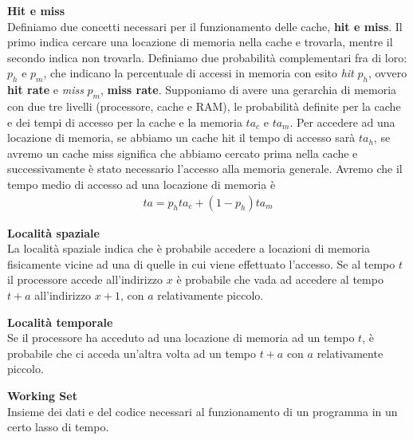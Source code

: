\begin{defn}
    \textbf{Hit e miss} \\
    Definiamo due concetti necessari per il funzionamento delle cache,
    \textbf{hit e miss}. Il primo indica cercare una locazione di memoria nella
    cache e trovarla, mentre il secondo indica non trovarla. Definiamo due
    probabilità complementari fra di loro: $p_h$ e $p_m$, che indicano la
    percentuale di accessi in memoria con esito \textit{hit} $p_h$, ovvero
    \textbf{hit rate} e \textit{miss} $p_m$, \textbf{miss rate}. Supponiamo di
    avere una gerarchia di memoria con due tre livelli (processore, cache e
    RAM), le probabilità definite per la cache e dei tempi di accesso per la
    cache e la memoria $ta_c$ e $ta_m$. Per accedere ad una locazione di
    memoria, se abbiamo un cache hit il tempo di accesso sarà $ta_h$, se avremo
    un cache miss significa che abbiamo cercato prima nella cache e
    successivamente è stato necessario l'accesso alla memoria generale. Avremo
    che il tempo medio di accesso ad una locazione di memoria è
    \begin{equation*}
        \begin{aligned}
            ta = p_h ta_c + (1-p_h)ta_m
        \end{aligned}
    \end{equation*}
\end{defn}

\begin{defn}
    \textbf{Località spaziale} \\
    La località spaziale indica che è probabile accedere a locazioni di memoria
    fisicamente vicine ad una di quelle in cui viene effettuato l'accesso. Se al
    tempo $t$ il processore accede all'indirizzo $x$ è probabile che vada ad
    accedere al tempo $t+a$ all'indirizzo $x+1$, con $a$ relativamente piccolo.
\end{defn}

\begin{defn}
    \textbf{Località temporale} \\
    Se il processore ha acceduto ad una locazione di memoria ad un tempo $t$, è
    probabile che ci acceda un'altra volta ad un tempo $t+a$ con $a$
    relativamente piccolo.
\end{defn}

\begin{defn}
    \textbf{Working Set} \\
    Insieme dei dati e del codice necessari al funzionamento di un programma in
    un certo lasso di tempo.
\end{defn}

